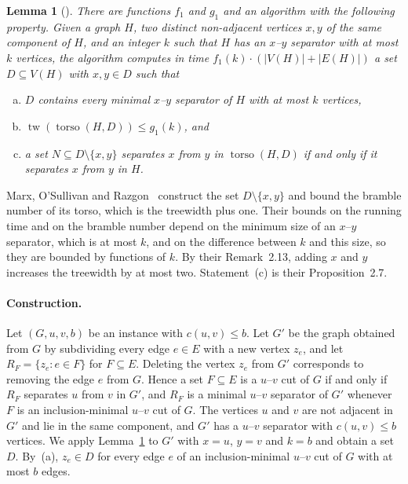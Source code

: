 \documentclass[a4paper,fleqn]{cas-sc}
\numberwithin{equation}{section}
\theoremstyle{definition}
\theoremstyle{plain}
\newtheorem{lemma}[definition]{Lemma}
\theoremstyle{remark}
\newcommand{\tw}{\operatorname{tw}}
\newcommand{\torso}{\operatorname{torso}}
\begin{document}
\begin{lemma}[{\cite[Proposition~2.7, Lemma~2.11 and Remark~2.13]{Marx2013Separators}}]
\label{lem:treewidth-reduction}
There are functions $f_1$ and $g_1$ and an algorithm with the following property.
Given a graph $H$, two distinct non-adjacent vertices $x, y$ of the same component of $H$, and an integer $k$ such that $H$ has an $x$--$y$ separator with at most $k$ vertices, the algorithm computes in time $f_1(k) \cdot (|V(H)| + |E(H)|)$ a set $D \subseteq V(H)$ with $x, y \in D$ such that
\begin{enumerate}[(a)]
    \item $D$ contains every minimal $x$--$y$ separator of $H$ with at most $k$ vertices,
    \item $\tw(\torso(H, D)) \leq g_1(k)$, and
    \item a set $N \subseteq D \setminus \{x, y\}$ separates $x$ from $y$ in $\torso(H, D)$ if and only if it separates $x$ from $y$ in $H$.
\end{enumerate}
\end{lemma}

Marx, O'Sullivan and Razgon~\cite[Lemma~2.11]{Marx2013Separators} construct the set $D \setminus \{x, y\}$ and bound the bramble number of its torso, which is the treewidth plus one.
Their bounds on the running time and on the bramble number depend on the minimum size of an $x$--$y$ separator, which is at most $k$, and on the difference between $k$ and this size, so they are bounded by functions of $k$.
By their Remark~2.13, adding $x$ and $y$ increases the treewidth by at most two.
Statement~(c) is their Proposition~2.7.

\paragraph{Construction.}
Let $(G, u, v, b)$ be an instance with $c(u,v) \leq b$.
Let $G'$ be the graph obtained from $G$ by subdividing every edge $e \in E$ with a new vertex $z_e$, and let $R_F = \{z_e : e \in F\}$ for $F \subseteq E$.
Deleting the vertex $z_e$ from $G'$ corresponds to removing the edge $e$ from $G$.
Hence a set $F \subseteq E$ is a $u$--$v$ cut of $G$ if and only if $R_F$ separates $u$ from $v$ in $G'$, and $R_F$ is a minimal $u$--$v$ separator of $G'$ whenever $F$ is an inclusion-minimal $u$--$v$ cut of $G$.
The vertices $u$ and $v$ are not adjacent in $G'$ and lie in the same component, and $G'$ has a $u$--$v$ separator with $c(u,v) \leq b$ vertices.
We apply Lemma~\ref{lem:treewidth-reduction} to $G'$ with $x = u$, $y = v$ and $k = b$ and obtain a set $D$.
By~(a), $z_e \in D$ for every edge $e$ of an inclusion-minimal $u$--$v$ cut of $G$ with at most $b$ edges.
\end{document}
